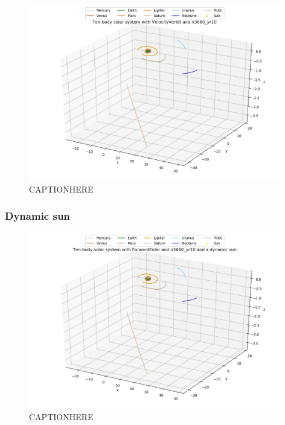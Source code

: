 \documentclass{article}
\begin{document}
    \begin{figure}[H]
        \centering
        \includegraphics[width = 11cm]{img/plot3D_10body_V_n3660_yr10.png}
        \caption{CAPTIONHERE}
        \label{fig:plot3D_10body_V_n3660_yr10}
    \end{figure}

\subsubsection{Dynamic sun}

    \begin{figure}[H]
        \centering
        \includegraphics[width = 11cm]{img/plot3D_10body_F_n3660_yr10_dynamic_sun.png}
        \caption{CAPTIONHERE}
        \label{fig:plot3D_10body_F_n3660_yr10_dynamic_sun}
    \end{figure}
\end{document}
